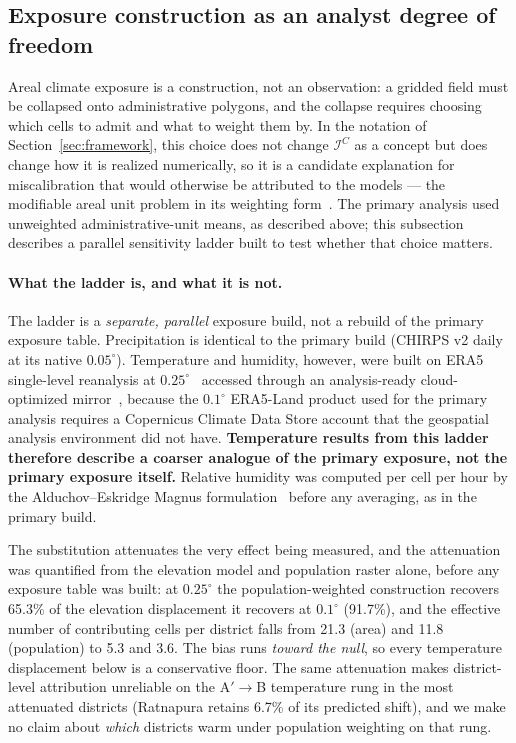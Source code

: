 \documentclass[11pt,a4paper]{article}
\begin{document}
\subsection{Exposure construction as an analyst degree of freedom}\label{sec:methods-wp5}
Areal climate exposure is a construction, not an observation: a gridded field must be collapsed onto administrative polygons, and the collapse requires choosing which cells to admit and what to weight them by. In the notation of Section~\ref{sec:framework}, this choice does not change $\mathcal I^{C}$ as a concept but does change how it is realized numerically, so it is a candidate explanation for miscalibration that would otherwise be attributed to the models --- the modifiable areal unit problem in its weighting form~\cite{Openshaw1984,Fotheringham1991}. The primary analysis used unweighted administrative-unit means, as described above; this subsection describes a parallel sensitivity ladder built to test whether that choice matters.

\paragraph{What the ladder is, and what it is not.} The ladder is a \emph{separate, parallel} exposure build, not a rebuild of the primary exposure table. Precipitation is identical to the primary build (CHIRPS v2 daily at its native $0.05^{\circ}$). Temperature and humidity, however, were built on ERA5 single-level reanalysis at $0.25^{\circ}$~\cite{Hersbach2020} accessed through an analysis-ready cloud-optimized mirror~\cite{Carver2023ARCO}, because the $0.1^{\circ}$ ERA5-Land product used for the primary analysis requires a Copernicus Climate Data Store account that the geospatial analysis environment did not have. \textbf{Temperature results from this ladder therefore describe a coarser analogue of the primary exposure, not the primary exposure itself.} Relative humidity was computed per cell per hour by the Alduchov--Eskridge Magnus formulation~\cite{AlduchovEskridge1996} before any averaging, as in the primary build.

The substitution attenuates the very effect being measured, and the attenuation was quantified from the elevation model and population raster alone, before any exposure table was built: at $0.25^{\circ}$ the population-weighted construction recovers 65.3\% of the elevation displacement it recovers at $0.1^{\circ}$ (91.7\%), and the effective number of contributing cells per district falls from 21.3 (area) and 11.8 (population) to 5.3 and 3.6. The bias runs \emph{toward the null}, so every temperature displacement below is a conservative floor. The same attenuation makes district-level attribution unreliable on the A$'\to$B temperature rung in the most attenuated districts (Ratnapura retains 6.7\% of its predicted shift), and we make no claim about \emph{which} districts warm under population weighting on that rung.
\end{document}
